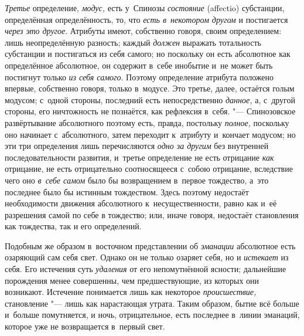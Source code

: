 {\em Третье} определение,
{\em модус,} есть у~Спинозы
{\em состояние} (affectio) субстанции, определённая
определённость, то, что {\em есть в~некотором другом} и
постигается {\em через это другое}. Атрибуты имеют,
собственно говоря, своим определением: лишь неопределённую разность; каждый
{\em должен} выражать тотальность субстанции и
постигаться из себя самого; но поскольку он есть абсолютное как
определённое абсолютное, он содержит в~себе инобытие и~не может быть
постигнут только {\em из себя самого}. Поэтому
определение атрибута положено впервые, собственно говоря, только в~модусе.
Это третье, далее, остаётся голым модусом; с~одной стороны, последний есть
непосредственно {\em данное,} а, с~другой стороны, его
ничтожность не познаётся, как рефлексия в~себя. "--- Спинозовское
развёртывание абсолютного поэтому есть, правда, постольку
{\em полное,} поскольку оно начинает с~абсолютного,
затем переходит к~атрибуту и~кончает модусом; но эти три определения лишь
перечисляются {\em одно за другим} без внутренней
последовательности развития, и~третье определение не есть отрицание
{\em как} отрицание, не есть отрицательно соотносящееся
с~собою отрицание, вследствие чего оно {\em в~себе
самом} было бы возвращением в~первое тождество, а~это последнее было бы
истинным тождеством. Здесь поэтому недостаёт необходимости движения
абсолютного к~несущественности, равно как и~её разрешения самой по себе в
тождество; или, иначе говоря, недостаёт становления как тождества, так и
его определений.

Подобным же образом в~восточном представлении об
{\em эманации} абсолютное есть озаряющий сам себя свет.
Однако он не только озаряет себя, но и {\em истекает}
из себя. Его истечения суть {\em удаления} от его
непомутнённой ясности; дальнейшие порождения менее совершенны, чем
предшествующие, из которых они возникают. Истечение понимается лишь как
некоторое {\em происшествие,} становление "--- лишь как
нарастающая утрата. Таким образом, бытие всё больше и~больше помутняется, и
ночь, отрицательное, есть последнее в~линии эманаций, которое уже не
возвращается в~первый свет.


